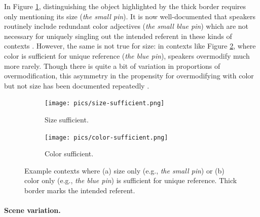 \documentclass[11pt]{article}
\newcommand{\figref}[1]{Figure \ref{#1}}
\begin{document}
In \figref{fig:sizesufficient}, distinguishing the object highlighted by the thick border requires only mentioning its size (\emph{the small pin}). 
It is now well-documented that speakers routinely include redundant color adjectives (\emph{the small blue pin}) which are not necessary for uniquely singling out the intended referent in these kinds of contexts \cite{Pechmann1989, Belke2002, gatt2011}. However, the same is not true for size: in contexts like \figref{fig:colorsufficient}, where color is sufficient for unique reference (\emph{the blue pin}), speakers overmodify much more rarely. Though there is quite a bit of variation in proportions of overmodification, this asymmetry in the propensity for overmodifying with color but not size has been documented repeatedly \cite{Pechmann1989, sedivy2003a,gatt2011, rubiofernandez2016,Westerbeek2015,Koolen2013}. 

\begin{figure}
\begin{subfigure}{.5\textwidth}
\texttt{[image: pics/size-sufficient.png]}
\caption{Size sufficient.}
\label{fig:sizesufficient}
\end{subfigure}
\begin{subfigure}{.5\textwidth}
\texttt{[image: pics/color-sufficient.png]}
\caption{Color sufficient.}
\label{fig:colorsufficient}
\end{subfigure}
\caption{Example contexts where (a) size only (e.g., \emph{the small pin}) or (b) color only (e.g., \emph{the blue pin}) is sufficient for unique reference. Thick border marks the intended referent.}
\label{fig:pin}
\end{figure}

\paragraph{Scene variation.}
\label{sec:scenevariation}
\end{document}
